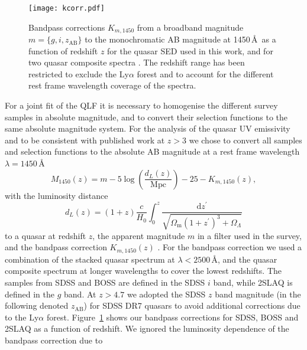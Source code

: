 \documentclass[fleqn,usenatbib]{mnras}
\begin{document}
\begin{figure}
    \texttt{[image: kcorr.pdf]}
  \caption{Bandpass corrections $K_{m,1450}$ from a broadband
    magnitude $m=\{g,i,z_\mathrm{AB}\}$ to the monochromatic AB
    magnitude at 1450\,\AA\ as a function of redshift $z$ for the
    \citet{2015MNRAS.449.4204L} quasar SED used in this work, and for
    two quasar composite spectra \citep{2001AJ....122..549V,
      2002ApJ...565..773T}.  The redshift range has been restricted to
    exclude the Ly$\alpha$ forest and to account for the different
    rest frame wavelength coverage of the spectra.}
  \label{fig:kcorr}
\end{figure}

For a joint fit of the QLF it is necessary to homogenise the different
survey samples in absolute magnitude, and to convert their selection
functions to the same absolute magnitude system. For the analysis of
the quasar UV emissivity and to be consistent with published work at
$z>3$ we chose to convert all samples and selection functions to the
absolute AB magnitude at a rest frame wavelength $\lambda=1450$\,\AA
\begin{equation}\label{eq:absmag}
  M_{1450}\left(z\right) = m-5\log{\left(\frac{d_L\left(z\right)}
    {\mathrm{Mpc}}\right)}-25-K_{m,1450}\left(z\right),
\end{equation}
with the luminosity distance
\begin{equation}
  d_L(z)=(1+z)\frac{c}{H_0}\int_0^z\frac{\mathrm{d}z^\prime}
  {\sqrt{\Omega_\mathrm{m}(1+z^\prime)^3+\Omega_\Lambda}}
  \label{eqn:dl}
\end{equation}
to a quasar at redshift $z$, the apparent magnitude $m$ in a filter used
in the survey, and the bandpass correction $K_{m,1450}\left(z\right)$
\citep{1956AJ.....61...97H, 1968ApJ...154...21O, 2000A&A...353..861W,
  2002astro.ph.10394H}. For the bandpass correction we used a
combination of the \citet{2015MNRAS.449.4204L} stacked quasar spectrum at
$\lambda<2500$\,\AA, and the \citet{2001AJ....122..549V} quasar
composite spectrum at longer wavelengths to cover the lowest
redshifts. The samples from SDSS and BOSS are defined in the SDSS $i$
band, while 2SLAQ is defined in the $g$ band. At $z>4.7$ we adopted
the SDSS $z$ band magnitude (in the following denoted $z_\mathrm{AB}$)
for SDSS DR7 quasars to avoid additional corrections due to the
Ly$\alpha$ forest. Figure~\ref{fig:kcorr} shows our bandpass
corrections for SDSS, BOSS and 2SLAQ as a function of redshift. We
ignored the luminosity dependence of the bandpass correction due to
\end{document}
